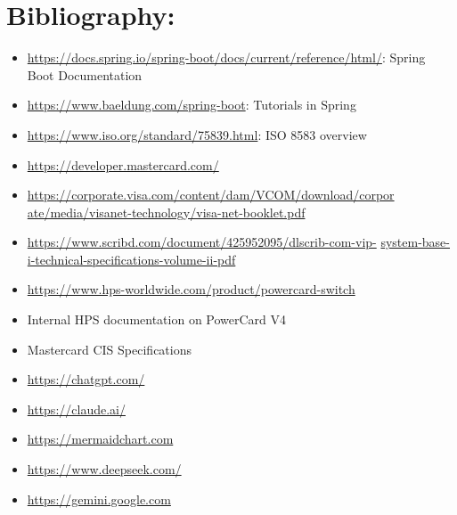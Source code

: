 \documentclass[12pt,a4paper]{report}
\begin{document}
\section{Bibliography:}
\begin{itemize}
\item
  \url{https://docs.spring.io/spring-boot/docs/current/reference/html/}:
  Spring Boot Documentation
\item
  \url{https://www.baeldung.com/spring-boot}: Tutorials in Spring
\item
  \url{https://www.iso.org/standard/75839.html}: ISO 8583 overview
\item
  \url{https://developer.mastercard.com/}
\item
  \href{https://corporate.visa.com/content/dam/VCOM/download/corporate/media/visanet-technology/visa-net-booklet.pdf}{https://corporate.visa.com/content/dam/VCOM/download/corpor}
  \href{https://corporate.visa.com/content/dam/VCOM/download/corporate/media/visanet-technology/visa-net-booklet.pdf}{ate/media/visanet-technology/visa-net-booklet.pdf}
\item
  \href{https://www.scribd.com/document/425952095/dlscrib-com-vip-system-base-i-technical-specifications-volume-ii-pdf}{https://www.scribd.com/document/425952095/dlscrib-com-vip-}
  \href{https://www.scribd.com/document/425952095/dlscrib-com-vip-system-base-i-technical-specifications-volume-ii-pdf}{system-base-i-technical-specifications-volume-ii-pdf}
\item
  \url{https://www.hps-worldwide.com/product/powercard-switch}
\item
  Internal HPS documentation on PowerCard V4
\item
  Mastercard CIS Specifications
\item
  \url{https://chatgpt.com/}
\item
  \url{https://claude.ai/}
\item
  \url{https://mermaidchart.com}
\item
  \url{https://www.deepseek.com/}
\item
  \url{https://gemini.google.com}
\end{itemize}
\end{document}
